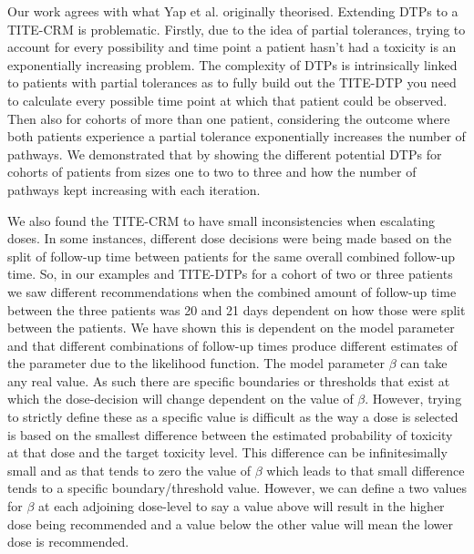 Our work agrees with what Yap et al. \cite{yapDoseTransitionPathways2017} originally theorised. Extending DTPs to a TITE-CRM is problematic. Firstly, due to the idea of partial tolerances, trying to account for every possibility and time point a patient hasn't had a toxicity is an exponentially increasing problem. The complexity of DTPs is intrinsically linked to patients with partial tolerances as to fully build out the TITE-DTP you need to calculate every possible time point at which that patient could be observed. Then also for cohorts of more than one patient, considering the outcome where both patients experience a partial tolerance exponentially increases the number of pathways. We demonstrated that by showing the different potential DTPs for cohorts of patients from sizes one to two to three and how the number of pathways kept increasing with each iteration. 

We also found the TITE-CRM to have small inconsistencies when escalating doses. In some instances, different dose decisions were being made based on the split of follow-up time between patients for the same overall combined follow-up time. So, in our examples and TITE-DTPs for a cohort of two or three patients we saw different recommendations when the combined amount of follow-up time between the three patients was 20 and 21 days dependent on how those were split between the patients. We have shown this is dependent on the model parameter and that different combinations of follow-up times produce different estimates of the parameter due to the likelihood function. The model parameter $\beta$ can take any real value. As such there are specific boundaries or thresholds that exist at which the dose-decision will change dependent on the value of $\beta$. However, trying to strictly define these as a specific value is difficult as the way a dose is selected is based on the smallest difference between the estimated probability of toxicity at that dose and the target toxicity level. This difference can be infinitesimally small and as that tends to zero the value of $\beta$ which leads to that small difference tends to a specific boundary/threshold value. However, we can define a two values for $\beta$ at each adjoining dose-level to say a value above will result in the higher dose being recommended and a value below the other value will mean the lower dose is recommended.

